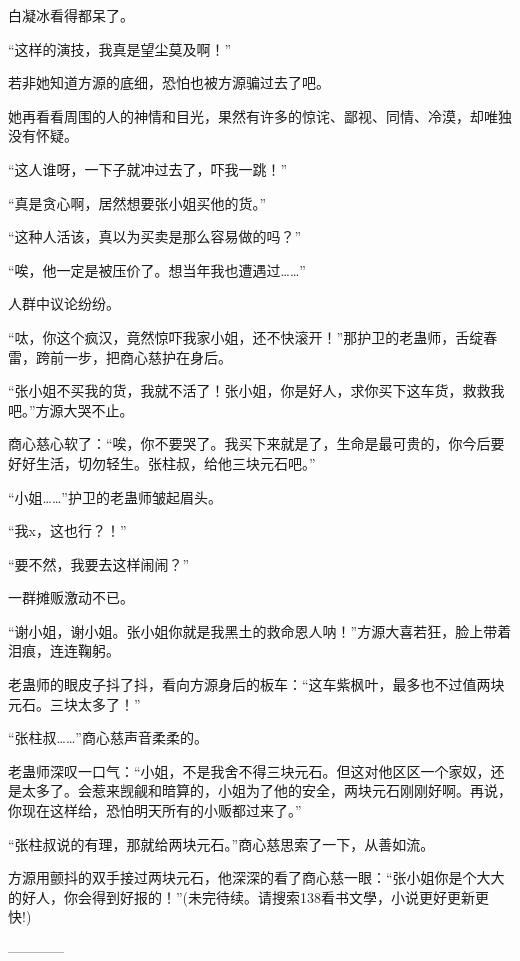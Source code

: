 \begin{this_body}
白凝冰看得都呆了。

“这样的演技，我真是望尘莫及啊！”

若非她知道方源的底细，恐怕也被方源骗过去了吧。

她再看看周围的人的神情和目光，果然有许多的惊诧、鄙视、同情、冷漠，却唯独没有怀疑。

“这人谁呀，一下子就冲过去了，吓我一跳！”

“真是贪心啊，居然想要张小姐买他的货。”

“这种人活该，真以为买卖是那么容易做的吗？”

“唉，他一定是被压价了。想当年我也遭遇过……”

人群中议论纷纷。

“呔，你这个疯汉，竟然惊吓我家小姐，还不快滚开！”那护卫的老蛊师，舌绽春雷，跨前一步，把商心慈护在身后。

“张小姐不买我的货，我就不活了！张小姐，你是好人，求你买下这车货，救救我吧。”方源大哭不止。

商心慈心软了：“唉，你不要哭了。我买下来就是了，生命是最可贵的，你今后要好好生活，切勿轻生。张柱叔，给他三块元石吧。”

“小姐……”护卫的老蛊师皱起眉头。

“我x，这也行？！”

“要不然，我要去这样闹闹？”

一群摊贩激动不已。

“谢小姐，谢小姐。张小姐你就是我黑土的救命恩人呐！”方源大喜若狂，脸上带着泪痕，连连鞠躬。

老蛊师的眼皮子抖了抖，看向方源身后的板车：“这车紫枫叶，最多也不过值两块元石。三块太多了！”

“张柱叔……”商心慈声音柔柔的。

老蛊师深叹一口气：“小姐，不是我舍不得三块元石。但这对他区区一个家奴，还是太多了。会惹来觊觎和暗算的，小姐为了他的安全，两块元石刚刚好啊。再说，你现在这样给，恐怕明天所有的小贩都过来了。”

“张柱叔说的有理，那就给两块元石。”商心慈思索了一下，从善如流。

方源用颤抖的双手接过两块元石，他深深的看了商心慈一眼：“张小姐你是个大大的好人，你会得到好报的！”(未完待续。请搜索138看书文學，小说更好更新更快!)

------------

\end{this_body}

